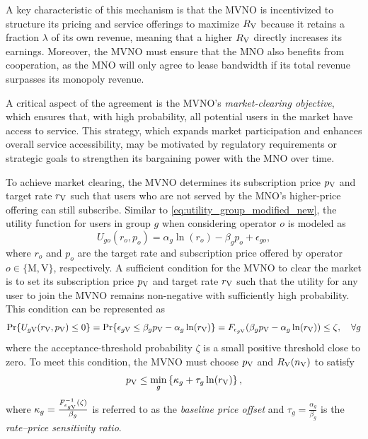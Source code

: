\documentclass[12pt, draftclsnofoot, onecolumn]{IEEEtran}
\begin{document}
		A key characteristic of this mechanism is that the MVNO is incentivized to structure its pricing and service offerings to maximize \( R_{\rm V} \) because it retains a fraction \( \lambda \) of its own revenue, meaning that a higher \( R_{\rm V} \) directly increases its earnings. Moreover, the MVNO must ensure that the MNO also benefits from cooperation, as the MNO will only agree to lease bandwidth if its total revenue surpasses its monopoly revenue. 
		
		A critical aspect of the agreement is the MVNO's \emph{market-clearing objective}, which ensures that, with high probability, all potential users in the market have access to service. This strategy, which expands market participation and enhances overall service accessibility, may be motivated by regulatory requirements or strategic goals to strengthen its bargaining power with the MNO over time.
		
		To achieve market clearing, the MVNO determines its subscription price \( p_{\rm V} \) and target rate \( r_{\rm V} \) such that users who are not served by the MNO’s higher-price offering can still subscribe.  Similar to \eqref{eq:utility_group_modified_new}, the utility function for users in group \( g \) when considering operator \( o \) is modeled as
		\begin{equation}
			U_{go}(r_o, p_o) = \alpha_g \ln(r_o) - \beta_g p_o + \epsilon_{go},
			\label{eq:utility_operator2}
		\end{equation}
		where \( r_o \) and \( p_o \) are the target rate and subscription price offered by operator \( o \in \{ \mathrm{M}, \mathrm{V} \} \), respectively.
		A sufficient condition for the MVNO to clear the market is to set its subscription price \( p_{\rm V} \) and target rate \( r_{\rm V} \) such that the utility for any user to join the MVNO remains non-negative with sufficiently high probability. This condition can be represented as
		\begin{align} \label{eq:strategy}
			\Pr\{U_{g{\rm V}}(r_{\rm V}, p_{\rm V}) \leq 0 \} = \Pr\{\epsilon_{g{\rm V}} \leq \beta_g p_{\rm V} - \alpha_g \ln(r_{\rm V})\} = F_{\epsilon_{g{\rm V}}}(\beta_g p_{\rm V} - \alpha_g \ln(r_{\rm V})) \leq \zeta, \quad \forall g
		\end{align}
		where the acceptance-threshold probability \(\zeta\) is a small positive threshold close to zero. To meet this condition, the MVNO must choose \( p_{\rm V} \) and \( R_{\rm V}(n_{\rm V}) \) to satisfy
		\begin{equation}\label{strategy2}
			p_{\rm V} \leq \min_{g} \left\{\kappa_g + \tau_g \ln(r_{\rm V})\right\},
		\end{equation}
		where \( \kappa_g = \frac{F^{-1}_{\epsilon_{g{\rm V}}}(\zeta)}{\beta_g} \) is referred to as the \textit{baseline price offset} and \( \tau_g = \frac{\alpha_g}{\beta_g} \) is the \textit{rate–price sensitivity ratio}.
		
\end{document}
